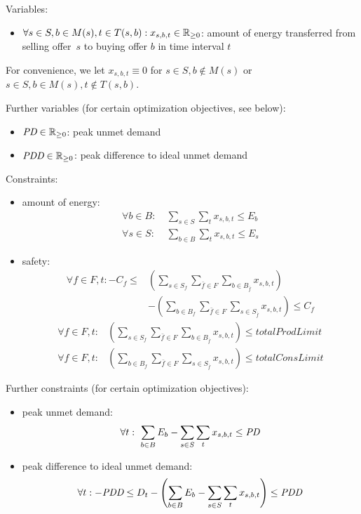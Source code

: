 Variables:
\begin{itemize}
\item $\forall s \in S, b \in M(s), t \in T(s, b): x_{s,b,t} \in \mathbb{R}_{\geq 0}$: amount of energy transferred from selling offer~$s$ to buying offer $b$ in time interval $t$
\end{itemize}
For convenience, we let $x_{s,b,t} \equiv 0$ for $s \in S, b \not\in M(s)$ or $s \in S, b \in M(s), t \not\in T(s, b)$.

Further variables (for certain optimization objectives, see below):
\begin{itemize}
\item $\textit{PD} \in \mathbb{R}_{\geq 0}$: peak unmet demand
\item $\textit{PDD} \in \mathbb{R}_{\geq 0}$: peak difference to ideal unmet demand
\end{itemize}

Constraints:
\begin{itemize}
\item amount of energy:
\begin{align}
\forall b \in B: ~& \sum_{s \in S} \sum_t x_{s,b,t} \leq E_b \\
\forall s \in S: ~& \sum_{b \in B} \sum_t x_{s,b,t} \leq E_s 
\end{align}
\item safety:
\begin{align}
\forall f \in F, t: -C_f \leq & \left( \sum_{s \in S_f} \sum_{\bar{f} \in F} \sum_{b \in B_{\bar{f}}} x_{s,b,t} \right) \nonumber \\
 & - \left( \sum_{b \in B_f} \sum_{\bar{f} \in F} \sum_{s \in S_{\bar{f}}} x_{s,b,t} \right)
\leq C_f 
\end{align}
\begin{align}
\forall f \in F, t: & \left( \sum_{s \in S_f} \sum_{\bar{f} \in F} \sum_{b \in B_{\bar{f}}} x_{s,b,t} \right) \leq totalProdLimit \\
\forall f \in F, t: & \left( \sum_{b \in B_f} \sum_{\bar{f} \in F} \sum_{s \in S_{\bar{f}}} x_{s,b,t} \right) \leq totalConsLimit 
\end{align}
\end{itemize}

Further constraints (for certain optimization objectives):
\begin{itemize}
\item peak unmet demand:
\begin{align}
\forall t: ~\sum_{b \in B} E_b - \sum_{s \in S} \sum_t x_{s,b,t} \leq \textit{PD} 
\end{align}
\item peak difference to ideal unmet demand:
\begin{align}
\forall t: -\textit{PDD} \leq D_t - \left( \sum_{b \in B} E_b - \sum_{s \in S} \sum_t x_{s,b,t} \right) \leq \textit{PDD}
\end{align}
\end{itemize}

